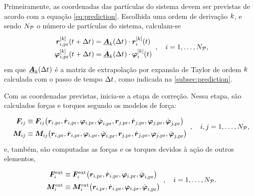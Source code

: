 Primeiramente, as coordenadas das partículas do sistema devem ser previstas de acordo com a equação \eqref{eq:prediction}. Escolhida uma ordem de derivação \(k\), e sendo \(N_{\mathcal{P}}\) o número de partículas do sistema, calculam-se
\begin{equation} \label{eq:position_and_orientation_prediction}
	\def\arraystretch{1.5}
	\begin{array}{c}
		\drvec{\taylorOrder}{\positionipr}\pqty{t+\Dt} = \extrapolationMatrix{\taylorOrder}[\Dt]\cdot\drvec{\taylorOrder}{\positioni}\pqty{t} \\
		\drvec{\taylorOrder}{\orientationipr}\pqty{t+\Dt} = \extrapolationMatrix{\taylorOrder}[\Dt]\cdot\drvec{\taylorOrder}{\orientationi}\pqty{t} \\
	\end{array}, \quad i = 1, \dotsc, \numberOfParticles,
\end{equation}
em que \(\extrapolationMatrix{\taylorOrder}[\Dt]\) é a matriz de extrapolação por expansão de Taylor de ordem \(k\) calculada com o passo de tempo \(\Delta t_{}\), como indicada na \autoref{subsec:prediction}.

Com as coordenadas previstas, inicia-se a etapa de correção. Nessa etapa, são calculados forças e torques segundo os modelos de força:
\begin{equation*}
	\def\arraystretch{1.5}
	\begin{array}{c}
		\forceij \equiv \forceij\pqty{\positionipr, \velocityipr, \orientationipr, \dorientationipr{1}, \positionjpr, \velocityjpr, \orientationjpr, \dorientationjpr{1}} \\
		\torqueij \equiv \torqueij\pqty{\positionipr, \velocityipr, \orientationipr, \dorientationipr{1}, \positionjpr, \velocityjpr, \orientationjpr, \dorientationjpr{1}}
	\end{array}, \quad i,j = 1, \dotsc, \numberOfParticles,
\end{equation*}
e, também, são computadas as forças e os torques devidos à ação de outros elementos,
\begin{equation*}
	\def\arraystretch{1.5}
	\begin{array}{c}
		\external\forcei \equiv \external\forcei\pqty{\positionipr, \velocityipr, \orientationipr, \dorientationipr{1}} \\
		\external\torquei \equiv \external\torquei\pqty{\positionipr, \velocityipr, \orientationipr, \dorientationipr{1}} \\
	\end{array}, \quad i = 1, \dotsc, \numberOfParticles.
\end{equation*}
\begin{equation*}
\end{equation*}

